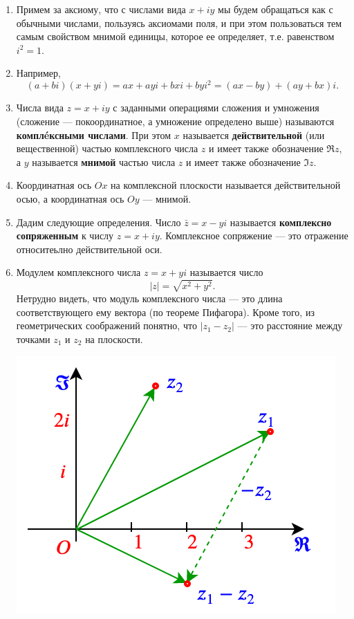 \begin{enumerate}
\item Примем за аксиому, что с числами вида $x+iy$ мы будем обращаться как с обычными числами, пользуясь аксиомами поля, и при этом пользоваться тем самым свойством мнимой единицы, которое ее определяет, т.е. равенством $i^2=1$.
\item Например,
$$
(a+bi)(x+yi) = ax + ayi + bxi + byi^2 = (ax-by) + (ay+bx)i.
$$
\item Числа вида $z=x+iy$ с заданными операциями сложения и умножения (сложение --- покоординатное, а умножение определено выше) называются \textbf{компл\'eксными числами}. При этом $x$ называется \textbf{действительной} (или вещественной) частью комплексного числа $z$ и имеет также обозначение $\Re z$, а $y$ называется \textbf{мнимой} частью числа $z$ и имеет также обозначение $\Im z$.
\item Координатная ось $Ox$ на комплексной плоскости называется действительной осью, а координатная ось $Oy$ --- мнимой.
\item Дадим следующие определения. Число $\bar z=x-yi$ называется \textbf{комплексно сопряженным} к числу $z=x+iy$. Комплексное сопряжение --- это отражение относитеьлно действительной оси.
\item Модулем комплексного числа $z=x+yi$ называется число $$|z|=\sqrt{x^2+y^2}.$$
Нетрудно видеть, что модуль комплексного числа --- это длина соответствующего ему вектора (по теореме Пифагора). Кроме того, из геометрических соображений понятно, что $|z_1-z_2|$ --- это расстояние между точками $z_1$ и $z_2$ на плоскости.
\begin{center}
\includegraphics[scale=0.5]{rho.png}
\end{center}

\end{enumerate}
